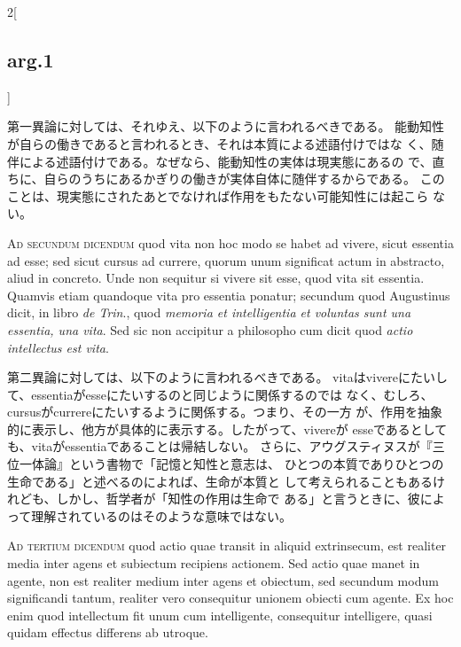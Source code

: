 \documentclass[paper=a4paper,fontsize=10pt,jafontsize=9pt,titlepage]{jlreq}
\begin{document}
\begin{paracol}{2}[\subsection{arg.1}]
\switchcolumn

第一異論に対しては、それゆえ、以下のように言われるべきである。
能動知性が自らの働きであると言われるとき、それは本質による述語付けではな
 く、随伴による述語付けである。なぜなら、能動知性の実体は現実態にあるの
 で、直ちに、自らのうちにあるかぎりの働きが実体自体に随伴するからである。
このことは、現実態にされたあとでなければ作用をもたない可能知性には起こら
 ない。

\switchcolumn*[\subsection{ad.2}]

{\scshape  Ad secundum dicendum} quod vita non hoc modo se habet ad
 vivere, sicut essentia ad esse; sed sicut cursus ad currere, quorum
 unum significat actum in abstracto, aliud in concreto. Unde non
 sequitur si vivere sit esse, quod vita sit essentia. Quamvis etiam
 quandoque vita pro essentia ponatur; secundum quod Augustinus dicit, in
 libro {\itshape de Trin}., quod {\itshape memoria et intelligentia et voluntas sunt una
 essentia, una vita}. Sed sic non accipitur a philosopho cum dicit quod
 {\itshape actio intellectus est vita}.

\switchcolumn

第二異論に対しては、以下のように言われるべきである。
vitaはvivereにたいして、essentiaがesseにたいするのと同じように関係するのでは
 なく、むしろ、cursusがcurrereにたいするように関係する。つまり、その一方
 が、作用を抽象的に表示し、他方が具体的に表示する。したがって、vivereが
 esseであるとしても、vitaがessentiaであることは帰結しない。
さらに、アウグスティヌスが『三位一体論』という書物で「記憶と知性と意志は、
 ひとつの本質でありひとつの生命である」と述べるのによれば、生命が本質と
 して考えられることもあるけれども、しかし、哲学者が「知性の作用は生命で
 ある」と言うときに、彼によって理解されているのはそのような意味ではない。

\switchcolumn*[\subsection{ad.3}]

{\scshape Ad tertium dicendum} quod actio quae transit in aliquid
 extrinsecum, est realiter media inter agens et subiectum recipiens
 actionem. Sed actio quae manet in agente, non est realiter medium inter
 agens et obiectum, sed secundum modum significandi tantum, realiter
 vero consequitur unionem obiecti cum agente. Ex hoc enim quod
 intellectum fit unum cum intelligente, consequitur intelligere, quasi
 quidam effectus differens ab utroque.


\end{paracol}
\end{document}
